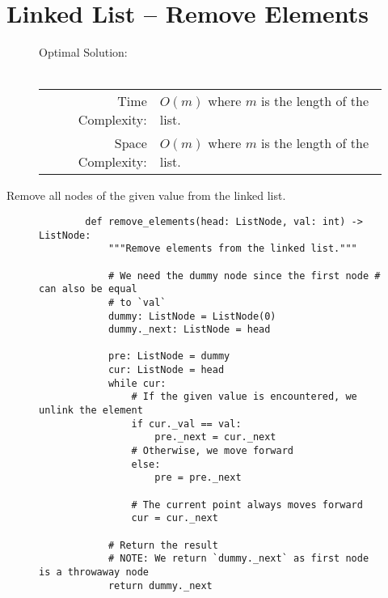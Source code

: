
\section{Linked List -- Remove Elements}

\begin{figure}[H]
    Optimal Solution:\\\\
    \begin{tabular}{rl}
        Time Complexity:& \(O(m)\) where \(m\) is the length of the list.\\
        Space Complexity:& \(O(m)\) where \(m\) is the length of the list.
    \end{tabular}
\end{figure}

Remove all nodes of the given value from the linked list.

\begin{figure}[H]
    \centering
    \begin{verbatim}
        def remove_elements(head: ListNode, val: int) -> ListNode:
            """Remove elements from the linked list."""

            # We need the dummy node since the first node # can also be equal
            # to `val`
            dummy: ListNode = ListNode(0)
            dummy._next: ListNode = head

            pre: ListNode = dummy
            cur: ListNode = head
            while cur:
                # If the given value is encountered, we unlink the element
                if cur._val == val:
                    pre._next = cur._next
                # Otherwise, we move forward
                else:
                    pre = pre._next

                # The current point always moves forward
                cur = cur._next

            # Return the result
            # NOTE: We return `dummy._next` as first node is a throwaway node
            return dummy._next
    \end{verbatim}
\end{figure}
